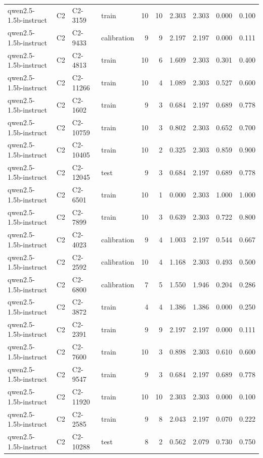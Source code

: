 \begin{table}
\begin{tabular}{llllrrrrrr}
qwen2.5-1.5b-instruct & C2 & C2-3159 & train & 10 & 10 & 2.303 & 2.303 & 0.000 & 0.100 \\
qwen2.5-1.5b-instruct & C2 & C2-9433 & calibration & 9 & 9 & 2.197 & 2.197 & 0.000 & 0.111 \\
qwen2.5-1.5b-instruct & C2 & C2-4813 & train & 10 & 6 & 1.609 & 2.303 & 0.301 & 0.400 \\
qwen2.5-1.5b-instruct & C2 & C2-11266 & train & 10 & 4 & 1.089 & 2.303 & 0.527 & 0.600 \\
qwen2.5-1.5b-instruct & C2 & C2-1602 & train & 9 & 3 & 0.684 & 2.197 & 0.689 & 0.778 \\
qwen2.5-1.5b-instruct & C2 & C2-10759 & train & 10 & 3 & 0.802 & 2.303 & 0.652 & 0.700 \\
qwen2.5-1.5b-instruct & C2 & C2-10405 & train & 10 & 2 & 0.325 & 2.303 & 0.859 & 0.900 \\
qwen2.5-1.5b-instruct & C2 & C2-12045 & test & 9 & 3 & 0.684 & 2.197 & 0.689 & 0.778 \\
qwen2.5-1.5b-instruct & C2 & C2-6501 & train & 10 & 1 & 0.000 & 2.303 & 1.000 & 1.000 \\
qwen2.5-1.5b-instruct & C2 & C2-7899 & train & 10 & 3 & 0.639 & 2.303 & 0.722 & 0.800 \\
qwen2.5-1.5b-instruct & C2 & C2-4023 & calibration & 9 & 4 & 1.003 & 2.197 & 0.544 & 0.667 \\
qwen2.5-1.5b-instruct & C2 & C2-2592 & calibration & 10 & 4 & 1.168 & 2.303 & 0.493 & 0.500 \\
qwen2.5-1.5b-instruct & C2 & C2-6800 & calibration & 7 & 5 & 1.550 & 1.946 & 0.204 & 0.286 \\
qwen2.5-1.5b-instruct & C2 & C2-3872 & train & 4 & 4 & 1.386 & 1.386 & 0.000 & 0.250 \\
qwen2.5-1.5b-instruct & C2 & C2-2391 & train & 9 & 9 & 2.197 & 2.197 & 0.000 & 0.111 \\
qwen2.5-1.5b-instruct & C2 & C2-7600 & train & 10 & 3 & 0.898 & 2.303 & 0.610 & 0.600 \\
qwen2.5-1.5b-instruct & C2 & C2-9547 & train & 9 & 3 & 0.684 & 2.197 & 0.689 & 0.778 \\
qwen2.5-1.5b-instruct & C2 & C2-11920 & train & 10 & 10 & 2.303 & 2.303 & 0.000 & 0.100 \\
qwen2.5-1.5b-instruct & C2 & C2-2585 & train & 9 & 8 & 2.043 & 2.197 & 0.070 & 0.222 \\
qwen2.5-1.5b-instruct & C2 & C2-10288 & test & 8 & 2 & 0.562 & 2.079 & 0.730 & 0.750 \\

\end{tabular}
\end{table}
